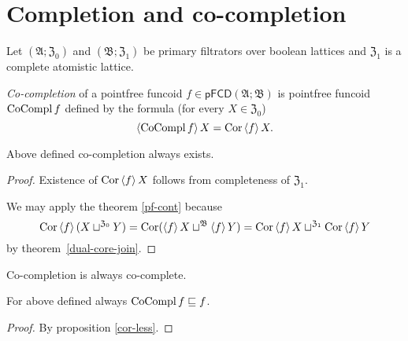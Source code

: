 \section{Completion and co-completion}
\begin{defn}
Let $(\mathfrak{A};\mathfrak{Z}_{0})$ and $(\mathfrak{B};\mathfrak{Z}_{1})$
be primary filtrators over boolean lattices and $\mathfrak{Z}_{1}$
is a complete atomistic lattice.

\emph{Co-completion}
of a pointfree funcoid $f\in\mathsf{pFCD}(\mathfrak{A};\mathfrak{B})$
is pointfree funcoid $\operatorname{CoCompl} f$ defined by the formula (for every
$X\in\mathfrak{Z}_{0}$) 
\[
\left\langle \operatorname{CoCompl} f\right\rangle X=\operatorname{Cor}\left\langle f\right\rangle X.
\]
\end{defn}
\begin{prop}
Above defined co-completion always exists.\end{prop}
\begin{proof}
Existence of $\operatorname{Cor}\left\langle f\right\rangle X$ follows from completeness of $\mathfrak{Z}_{1}$.

We may apply the theorem \ref{pf-cont} because 
\[
\operatorname{Cor}\left\langle f\right\rangle(X\sqcup^{\mathfrak{Z}_{0}}Y)=\operatorname{Cor}(\left\langle f\right\rangle X\sqcup^{\mathfrak{B}}\left\langle f\right\rangle Y)=\operatorname{Cor}\left\langle f\right\rangle X\sqcup^{\mathfrak{Z}_{1}}\operatorname{Cor}\left\langle f\right\rangle Y
\]
by theorem~\ref{dual-core-join}.\end{proof}
\begin{obvious}
Co-completion is always co-complete.\end{obvious}
\begin{prop}
For above defined always $\operatorname{CoCompl} f\sqsubseteq f$.\end{prop}
\begin{proof}
By proposition \ref{cor-less}.
\end{proof}

